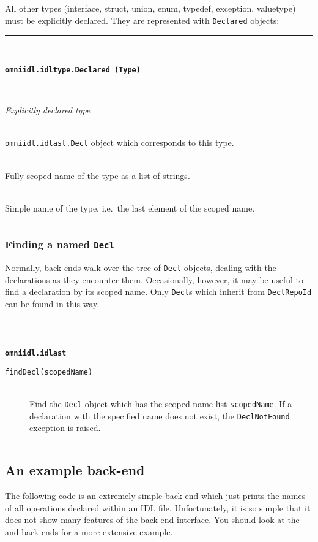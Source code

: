 \documentclass[11pt,twoside,a4paper]{article}
\newcommand{\func}[1]{\texttt{#1}}
\newcommand{\var}[1]{\texttt{#1}}
\newcommand{\class}[1]{\texttt{#1}}
\newcommand{\dfunc}[1]{\item[\func{#1}]\mbox{}\\}
\newenvironment{funcdesc}[1]%
  {\vspace{\baselineskip}%
   \noindent\begin{minipage}{\textwidth}%
   \noindent\rule{\textwidth}{1.5pt}\\%
   \centerline{\textbf{\texttt{#1}}}%
   \vspace{-.5\baselineskip}%
   \begin{description}}
  {\vspace{-\baselineskip}\end{description}%
   \noindent\rule{\textwidth}{1.5pt}\end{minipage}}
\newenvironment{classdesc}[2]%
  {\vspace{\baselineskip}%
   \noindent\begin{minipage}{\textwidth}%
   \noindent\rule{\textwidth}{1.5pt}\\%
   \centerline{\textbf{\texttt{#1}}}\\%
   \centerline{\textit{#2}}%
   \vspace{-.5\baselineskip}%
   \begin{description}}
  {\vspace{-\baselineskip}\end{description}%
   \noindent\rule{\textwidth}{1.5pt}\end{minipage}}
\newcommand{\file}{\begingroup \urlstyle{tt}\Url}
\begin{document}
\vspace{\baselineskip}

\noindent
All other types (interface, struct, union, enum, typedef, exception,
valuetype) must be explicitly declared. They are represented with
\class{Declared} objects:

\begin{classdesc}
  {omniidl.idltype.Declared (Type)}
  {Explicitly declared type}
  \label{cls:typeDeclared}

\dfunc{decl()}
  \class{omniidl.idlast.Decl} object which corresponds to this type.

\dfunc{scopedName()}
  Fully scoped name of the type as a list of strings.

\dfunc{name()}
  Simple name of the type, i.e.\ the last element of the scoped name.

\end{classdesc}



\subsubsection{Finding a named \class{Decl}}

Normally, back-ends walk over the tree of \class{Decl} objects,
dealing with the declarations as they encounter them. Occasionally,
however, it may be useful to find a declaration by its scoped name.
Only \class{Decl}s which inherit from \class{DeclRepoId} can be found
in this way.

\begin{funcdesc}{omniidl.idlast}

\dfunc{findDecl(scopedName)}
  Find the \class{Decl} object which has the scoped name list
  \var{scopedName}. If a declaration with the specified name does not
  exist, the \class{DeclNotFound} exception is raised.

\end{funcdesc}



\subsection{An example back-end}

The following code is an extremely simple back-end which just prints
the names of all operations declared within an IDL file.
Unfortunately, it is so simple that it does not show many features of
the back-end interface. You should look at the \file{dump.py} and
\file{python.py} back-ends for a more extensive example.
\end{document}
